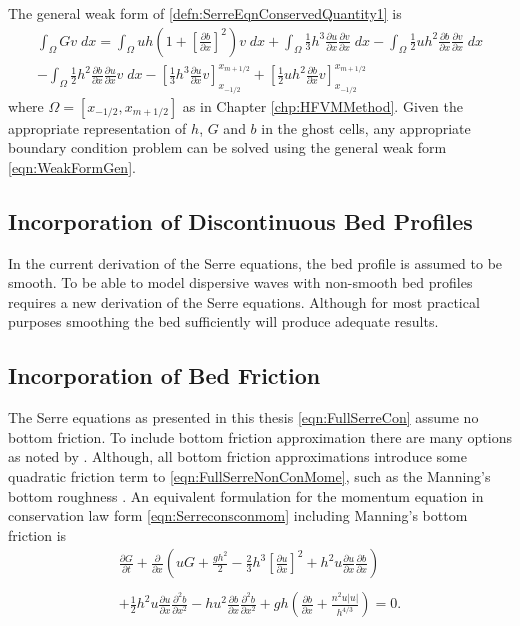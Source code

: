 The general weak form of \eqref{defn:SerreEqnConservedQuantity1} is
\begin{multline}
\int_{\Omega } G v \; dx = \int_{\Omega } uh \left(1 + \left[\frac{\partial b}{\partial x}\right]^2 \right) v \; dx +  \int_{\Omega } \frac{1}{3}h^3  \frac{\partial {u}}{\partial x} \frac{\partial v}{\partial x} \; dx - 
\int_{\Omega }   \frac{1}{2} u h^2\frac{\partial b}{\partial x}  \frac{\partial v }{\partial x}\; dx  \\ - 
\int_{\Omega }   \frac{1}{2}h^2\frac{\partial b}{\partial x}  \frac{\partial u }{\partial x}v \; dx  - \left[\frac{1}{3} h^3  \frac{\partial {u}}{\partial x} v\right]_{x_{-1/2}}^{x_{m+1/2}} + \left[\frac{1}{2} uh^2  \frac{\partial {b}}{\partial x} v\right]_{x_{-1/2}}^{x_{m+1/2}}
\label{eqn:WeakFormGen}
\end{multline}
where $\Omega = \left[x_{-1/2},x_{m+1/2}\right]$ as in Chapter \ref{chp:HFVMMethod}. Given the appropriate representation of $h$, $G$ and $b$ in the ghost cells, any appropriate boundary condition problem can be solved using the general weak form \eqref{eqn:WeakFormGen}.

\subsection{Incorporation of Discontinuous Bed Profiles}
In the current derivation of the Serre equations, the bed profile is assumed to be smooth. To be able to model dispersive waves with non-smooth bed profiles requires a new derivation of the Serre equations. Although for most practical purposes smoothing the bed sufficiently will produce adequate results.

\subsection{Incorporation of Bed Friction}
The Serre equations as presented in this thesis \eqref{eqn:FullSerreCon} assume no bottom friction. To include bottom friction approximation there are many options as noted by \citet{DoCarmo-2019-125}. Although, all bottom friction approximations introduce some quadratic friction term to \eqref{eqn:FullSerreNonConMome}, such as the Manning's bottom roughness \cite{Tissier-2011,Filippini-etal-2016-381,DoCarmo-2019-125}. An equivalent formulation for the momentum equation in conservation law form \eqref{eqn:Serreconsconmom} including Manning's bottom friction \cite{ChowVenTe} is 
\begin{equation}
	\begin{split}
		\frac{\partial G}{\partial t}  + \frac{\partial}{\partial x} \left( {u} G + \frac{gh^2}{2} -  \frac{2}{3}h^3 \left[\frac{\partial {u}}{\partial x}\right]^2 + h^2 {u}\frac{\partial {u}}{\partial x}\frac{\partial b}{\partial x} \right) \\ \\ +   \frac{1}{2}h^2 {u} \frac{\partial {u}}{\partial x} \frac{\partial^2 b}{\partial x^2}  - h {u}^2\frac{\partial b}{\partial x}\frac{\partial^2 b}{\partial x^2}  + gh \left(\frac{\partial b}{\partial x} + \frac{n^2 u \left|u\right|}{h^{4/3}} \right)   = 0.
	\end{split}
\end{equation}

